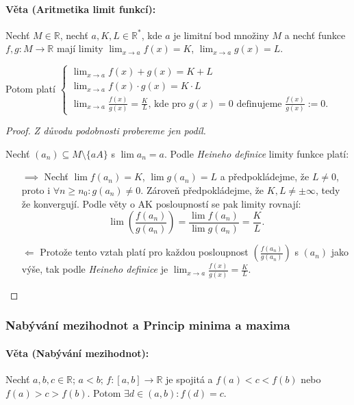 \documentclass[10pt,a4paper]{article}
\newcommand{\R}{{\mathbb{R}}}
\begin{document}
\paragraph*{Věta (Aritmetika limit funkcí):}  Nechť $M \in \R$, nechť $a, K, L \in \R^*$, kde $a$ je limitní bod množiny $M$ a nechť funkce $f, g : M \to \R$ mají limity
$\displaystyle \lim_{x\to a} f(x) = K$, $\displaystyle \lim_{x\to a} g(x) = L$. 

Potom platí $\displaystyle \begin{cases}
    \displaystyle \lim_{x\to a}f(x) + g(x) = K +L\\
    \displaystyle \lim_{x\to a}f(x) \cdot g(x) = K\cdot L\\
    \displaystyle \lim_{x\to a}\frac{f(x)}{g(x)} = \frac KL \text{, kde pro $g(x)=0$ definujeme $\frac{f(x)}{g(x)} := 0$.}
\end{cases}$

\begin{proof}
    \textit{Z důvodu podobnosti probereme jen podíl.} 
    
    Nechť $(a_n) \subseteq M \setminus \{aA\}$ s $\lim a_n = a$. 
    Podle \textit{Heineho definice} limity funkce platí: 
    \begin{itemize}
        \item [$\implies$] Nechť $\lim f(a_n) = K$, $\lim g(a_n) = L$ a předpokládejme, že $L \neq 0$, proto i $\forall n \geq n_0: g(a_n) \neq 0$.
        Zároveň předpokládejme, že  $K, L \neq \pm \infty$, tedy že konvergují.
        Podle věty o AK posloupností se pak limity rovnají: \[
            \lim \left (\frac{f(a_n)}{g(a_n)}\right ) = \frac{\lim f(a_n)}{\lim g(a_n)} = \frac KL.
        \] 
        \item [$\Longleftarrow$] Protože tento vztah platí pro každou posloupnost $\left (\frac {f(a_n)}{g(a_n )}\right )$ s $(a_n)$ jako výše, tak podle \textit{Heineho definice} je
            $\displaystyle \lim_{x\to a} \frac {f(x)}{g(x)} = \frac KL$.
    \end{itemize}
\end{proof}
\subsubsection{Nabývání mezihodnot a Princip minima a maxima}

\paragraph*{Věta (Nabývání mezihodnot):} Nechť $a,b,c \in \R$; $a < b$; $f:[a, b] \to \R$ je spojitá a $f(a) < c < f(b)$ nebo $f(a) > c > f(b)$. 
Potom $\exists d \in (a, b): f(d) = c$.
\end{document}
